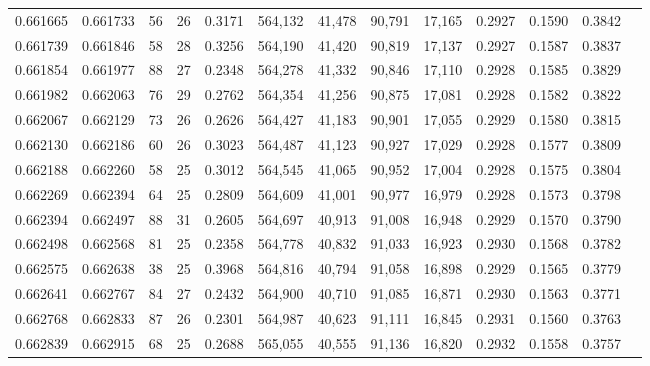 \begin{tabular}{rrrrrrrrrrrrr}
0.661665 & 0.661733 &  56 &  26 &                                     0.3171 & 564,132 &  41,478 &  90,791 &  17,165 & 0.2927 & 0.1590 & 0.3842 \\
0.661739 & 0.661846 &  58 &  28 &                                     0.3256 & 564,190 &  41,420 &  90,819 &  17,137 & 0.2927 & 0.1587 & 0.3837 \\
0.661854 & 0.661977 &  88 &  27 &                                     0.2348 & 564,278 &  41,332 &  90,846 &  17,110 & 0.2928 & 0.1585 & 0.3829 \\
0.661982 & 0.662063 &  76 &  29 &                                     0.2762 & 564,354 &  41,256 &  90,875 &  17,081 & 0.2928 & 0.1582 & 0.3822 \\
0.662067 & 0.662129 &  73 &  26 &                                     0.2626 & 564,427 &  41,183 &  90,901 &  17,055 & 0.2929 & 0.1580 & 0.3815 \\
0.662130 & 0.662186 &  60 &  26 &                                     0.3023 & 564,487 &  41,123 &  90,927 &  17,029 & 0.2928 & 0.1577 & 0.3809 \\
0.662188 & 0.662260 &  58 &  25 &                                     0.3012 & 564,545 &  41,065 &  90,952 &  17,004 & 0.2928 & 0.1575 & 0.3804 \\
0.662269 & 0.662394 &  64 &  25 &                                     0.2809 & 564,609 &  41,001 &  90,977 &  16,979 & 0.2928 & 0.1573 & 0.3798 \\
0.662394 & 0.662497 &  88 &  31 &                                     0.2605 & 564,697 &  40,913 &  91,008 &  16,948 & 0.2929 & 0.1570 & 0.3790 \\
0.662498 & 0.662568 &  81 &  25 &                                     0.2358 & 564,778 &  40,832 &  91,033 &  16,923 & 0.2930 & 0.1568 & 0.3782 \\
0.662575 & 0.662638 &  38 &  25 &                                     0.3968 & 564,816 &  40,794 &  91,058 &  16,898 & 0.2929 & 0.1565 & 0.3779 \\
0.662641 & 0.662767 &  84 &  27 &                                     0.2432 & 564,900 &  40,710 &  91,085 &  16,871 & 0.2930 & 0.1563 & 0.3771 \\
0.662768 & 0.662833 &  87 &  26 &                                     0.2301 & 564,987 &  40,623 &  91,111 &  16,845 & 0.2931 & 0.1560 & 0.3763 \\
0.662839 & 0.662915 &  68 &  25 &                                     0.2688 & 565,055 &  40,555 &  91,136 &  16,820 & 0.2932 & 0.1558 & 0.3757 \\

\end{tabular}
